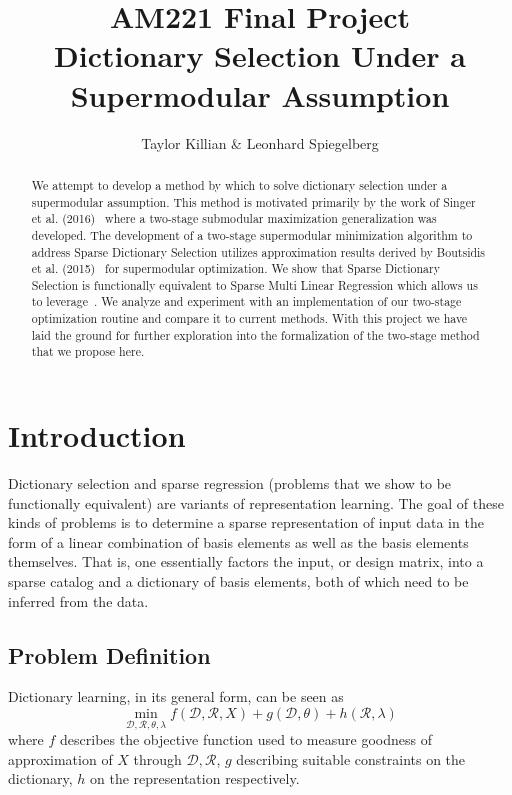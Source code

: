 \documentclass{article}
\newcommand{\Rr}{\mathcal{R}}
\newcommand{\D}{\mathcal{D}}
\begin{document}
\title{AM221 Final Project \\ \large Dictionary Selection Under a Supermodular Assumption}
\author{Taylor Killian \& Leonhard Spiegelberg}
\maketitle

\begin{abstract}
We attempt to develop a method by which to solve dictionary selection under a supermodular assumption. This method is motivated primarily by the work of Singer et al. (2016)~\cite{Singer16TwoStage} where a two-stage submodular maximization generalization was developed. The development of a two-stage supermodular minimization algorithm to address Sparse Dictionary Selection utilizes approximation results derived by Boutsidis et al. (2015)~\cite{weaklyalpha} for supermodular optimization. We show that Sparse Dictionary Selection is functionally equivalent to Sparse Multi Linear Regression which allows us to leverage~\cite{weaklyalpha}. We analyze and experiment with an implementation of our two-stage optimization routine and compare it to current methods. With this project we have laid the ground for further exploration into the formalization of the two-stage method that we propose here.
\end{abstract}

\section{Introduction}\label{sec:intro}

Dictionary selection and sparse regression (problems that we show to be functionally equivalent) are variants of representation learning. The goal of these kinds of problems is to determine a sparse representation of input data in the form of a linear combination of basis elements as well as the basis elements themselves. That is, one essentially factors the input, or design matrix, into a sparse catalog and a dictionary of basis elements, both of which need to be inferred from the data.\\

\subsection{Problem Definition}\label{sec:problem}
\noindent Dictionary learning, in its general form, can be seen as
\[
\min_{\D, \Rr, \theta, \lambda} f(\D, \Rr, X) + g(\D, \theta) + h(\Rr, \lambda)
\]
where $f$ describes the objective function used to measure goodness of approximation of $X$ through $\D, \Rr$, $g$ describing suitable constraints on the dictionary, $h$ on the representation respectively.\\
\end{document}
